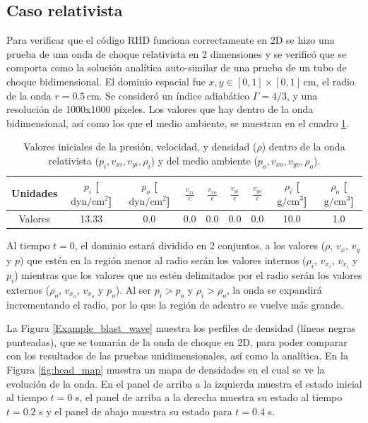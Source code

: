 \documentclass[12pt,a4paper]{book}
\begin{document}
\subsection{Caso relativista} \label{subsec:caso_relativista_2d}
Para verificar que el código RHD funciona correctamente en 2D se hizo una prueba de una onda de choque relativista en 2 dimensiones y se verificó que se comporta como la solución analítica auto-similar de 
una prueba de un tubo de choque bidimensional. El dominio espacial fue $x, y \in [0,1]\times[0,1] \, \text{cm}$, el radio de la 
onda $r = 0.5 \, \text{cm}$. Se consideró un índice adiabático $\Gamma = 4/3$, y una resolución de 1000x1000 píxeles. Los valores que hay dentro de la onda bidimensional, así como 
los que el medio ambiente, se muestran en el cuadro \ref{Cuadro_parametros_choque_2D}. 
\begin{table}[htbp]
  \begin{center}
  \begin{tabular}{|c|c|c|c|c|c|c|c|c|}
  \hline 
  \textbf{Unidades} & \textbf{$p_i$} [$\text{dyn}/\text{cm}^2$] & 
  \textbf{$p_o$} [$\text{dyn}/\text{cm}^2$] & 
  $\frac{v_{xi}}{c}$ & $\frac{v_{xo}}{c}$  & $\frac{v_{yi}}{c}$ & $\frac{v_{yo}}{c}$   & 
  \textbf{$\rho_i$} [$\text{g}/\text{cm}^3$]& 
  \textbf{$\rho_o$} [$\text{g}/\text{cm}^3$]\\ 
  \hline 
  Valores & 13.33  & 0.0  & 0.0 & 0.0 & 0.0 & 0.0 & 10.0  & 1.0 \\ 
  \hline 
  \end{tabular}
  \caption{\label{Cuadro_parametros_choque_2D} Valores iniciales 
  de la presión, velocidad, y densidad ($\rho$) dentro de la onda relativista ($p_i, v_{xi}, v_{yi}, \rho_i$) y del medio ambiente ($p_o, v_{xo}, v_{yo}, \rho_o$).}
  \end{center}
\end{table}

Al tiempo $t = 0$, el dominio estará dividido en 2 conjuntos, a los valores ($\rho$, $v_x$, $v_y$ y $p$) que estén en la región menor al radio serán los valores internos ($\rho_i$, $v_{x_{i}}$, $v_{x_{i}}$ y $p_i$) mientras 
que los valores que no estén delimitados por el radio serán los valores externos ($\rho_o$, $v_{x_{o}}$, $v_{x_{o}}$ y $p_o$). Al ser $p_i > p_o$ y $\rho_i > \rho_o$, la onda se  expandirá incrementando el radio, por 
lo que la región de adentro se vuelve más grande.

La Figura \ref{Example_blast_wave} muestra los perfiles de densidad (líneas negras punteadas), que se tomarán de la onda de choque en 2D, para poder comparar con los resultados de las pruebas unidimensionales, 
así como la analítica. En la Figura \ref{fig:head_map} muestra un mapa de densidades en el cual se ve la evolución de la onda. En el panel de arriba a la izquierda muestra el estado inicial al tiempo $t = 0$ s, el panel 
de arriba a la derecha muestra su estado al tiempo $t = 0.2$ s y el panel de abajo muestra su estado para $t = 0.4$ s. 
\end{document}
